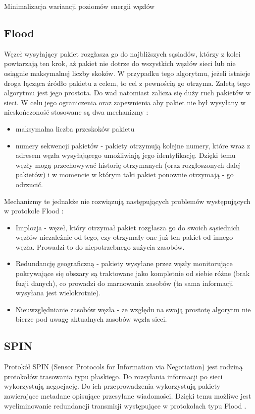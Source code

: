 Minimalizacja wariancji poziomów energii węzłów


\subsection{Flood}
Węzeł wysyłający pakiet rozgłasza go do najbliższych sąsiadów, którzy z kolei powtarzają ten krok, aż pakiet nie dotrze do wszystkich węzłów sieci lub nie osiągnie maksymalnej liczby skoków.
W przypadku tego algorytmu, jeżeli istnieje droga łącząca źródło pakietu z celem, to cel z pewnością go otrzyma.
Zaletą tego algorytmu jest jego prostota. Do wad natomiast zalicza się duży ruch pakietów w sieci. W celu jego ograniczenia oraz zapewnienia aby pakiet nie był wysyłany w nieskończoność stosowane są dwa mechanizmy \cite{Dargie2010}:
\begin{itemize}
	\item maksymalna liczba przeskoków pakietu
	\item numery sekwencji pakietów - pakiety otrzymują kolejne numery, które wraz z adresem węzła wysyłającego umożliwiają jego identyfikację. Dzięki temu węzły mogą przechowywać historię otrzymanych (oraz rozgłoszonych dalej pakietów) i w momencie w którym taki pakiet ponownie otrzymają - go odrzucić.
\end{itemize}

Mechanizmy te jednakże nie rozwiązują następujących problemów występujących w protokole Flood \cite{Dargie2010}:
\begin{itemize}
	\item Implozja - węzeł, który otrzymał pakiet rozgłasza go do swoich sąsiednich węzłów niezależnie od tego, czy otrzymały one już ten pakiet od innego węzła. Prowadzi to do niepotrzebnego zużycia zasobów. %
	\item Redundancję geograficzną - pakiety wysyłane przez węzły monitorujące pokrywające się obszary są traktowane jako kompletnie od siebie różne (brak fuzji danych), co prowadzi do marnowania zasobów (ta sama informacji wysyłana jest wielokrotnie). %
	\item Nieuwzględnianie zasobów węzła - ze względu na swoją prostotę algorytm nie bierze pod uwagę aktualnych zasobów węzła sieci.
\end{itemize}
\subsection{SPIN}
Protokół SPIN (Sensor Protocols for Information via Negotiation) jest rodziną protokołów trasowania typu płaskiego. Do rozsyłania informacji po sieci wykorzystują negocjację. Do ich przeprowadzenia wykorzystują pakiety zawierające metadane opisujące przesyłane wiadomości. Dzięki temu możliwe jest wyeliminowanie redundancji transmisji występujące w protokołach typu Flood \cite{Chaudhary2015}.

